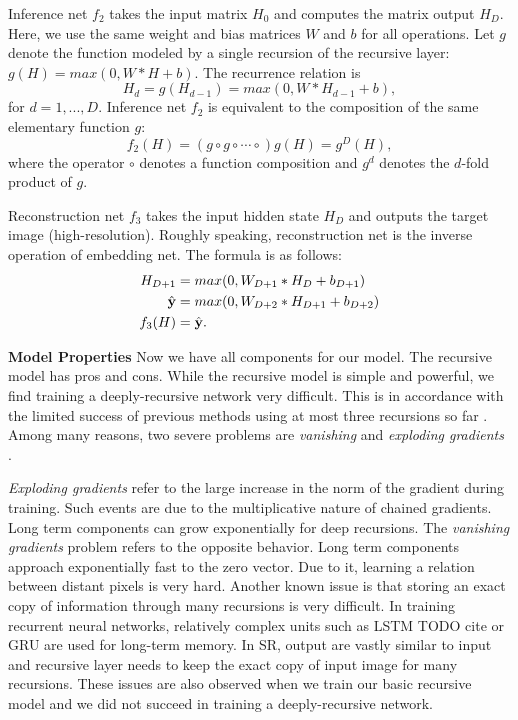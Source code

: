 \documentclass[10pt,twocolumn,letterpaper]{article}
\begin{document}
Inference net $f_2$ takes the input matrix $H_0$ and computes the matrix output $H_{D}$. Here, we use the same weight and bias matrices $W$ and $b$ for all operations.  Let $g$ denote the function modeled by a single recursion of the recursive layer: $g(H)=max(0,W*H+b)$. The recurrence relation is  
\begin{equation}
 H_d = g(H_{d-1}) = max(0,W*H_{d-1}+b),
\end{equation}
for $d = 1, ..., D$. 
Inference net $f_2$ is equivalent to the composition of the same elementary function $g$: 
\begin{equation}
f_2(H) = (g \circ g \circ \cdots \circ) g(H) =  g^{D}(H),
\end{equation}
where the operator $\circ$ denotes a function composition and $g^{d}$ denotes the $d$-fold product of $g$.

Reconstruction net $f_3$ takes the input hidden state $H_D$ and outputs the target image (high-resolution). Roughly speaking, reconstruction net is the inverse operation of embedding net. The formula is as follows:
\begin{align}
	H_{D+1} &= max(0, W_{D+1}*H_D + b_{D+1})\\
	\hat{{\bf y}} &= max(0, W_{D+2}*H_{D+1} + b_{D+2})\\
	f_3(H) &= \hat{{\bf y}}.
\end{align}

\textbf{Model Properties} Now we have all components for our model. The recursive model has pros and cons. While the recursive model is simple and powerful, we find training a deeply-recursive network very difficult. This is in accordance with the limited success of previous methods using at most three recursions so far \cite{Liang_2015_CVPR}.  Among many reasons, two severe problems are \textit{vanishing} and \textit{exploding gradients} \cite{bengio1994learning, pascanu2013difficulty}.  

\textit{Exploding gradients} refer to the large increase in the norm
of the gradient during training. Such events are due to
the multiplicative nature of chained gradients. Long term components can grow exponentially for deep recursions. The
\textit{vanishing gradients} problem refers to the opposite behavior. Long term components approach exponentially
fast to the zero vector. Due to it, learning a relation between distant pixels is very hard. Another known issue is that storing an exact copy of information through many recursions is very difficult. In training recurrent neural networks, relatively complex units such as LSTM TODO cite or GRU are used for long-term memory. In SR, output are vastly similar to input and recursive layer needs to keep the exact copy of input image for many recursions. These issues are also observed when we train our basic recursive model and we did not succeed in training a deeply-recursive network. 
\end{document}
